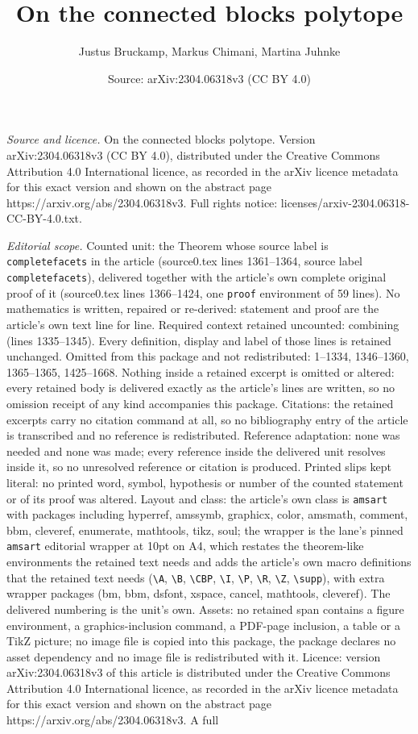 \documentclass[10pt,a4paper]{amsart}
\title[On the connected blocks polytope]{On the connected blocks polytope}
\author{Justus Bruckamp, Markus Chimani, Martina Juhnke}
\date{Source: arXiv:2304.06318v3 (CC BY 4.0)}
\begin{document}
\maketitle

\noindent\emph{Source and licence.} On the connected blocks polytope. Version arXiv:2304.06318v3 (CC BY 4.0), distributed under the Creative Commons Attribution 4.0 International licence, as recorded in the arXiv licence metadata for this exact version and shown on the abstract page https://arxiv.org/abs/2304.06318v3. Full rights notice: licenses/arxiv-2304.06318-CC-BY-4.0.txt.\par\smallskip

\noindent\textit{Editorial scope.} Counted unit: the Theorem whose source label is \texttt{completefacets} in the article (source0.tex lines 1361--1364, source label \texttt{completefacets}), delivered together with the article's own complete original proof of it (source0.tex lines 1366--1424, one \texttt{proof} environment of 59 lines). No mathematics is written, repaired or re-derived: statement and proof are the article's own text line for line. Required context retained uncounted: combining (lines 1335--1345). Every definition, display and label of those lines is retained unchanged. Omitted from this package and not redistributed: 1--1334, 1346--1360, 1365--1365, 1425--1668. Nothing inside a retained excerpt is omitted or altered: every retained body is delivered exactly as the article's lines are written, so no omission receipt of any kind accompanies this package. Citations: the retained excerpts carry no citation command at all, so no bibliography entry of the article is transcribed and no reference is redistributed. Reference adaptation: none was needed and none was made; every reference inside the delivered unit resolves inside it, so no unresolved reference or citation is produced. Printed slips kept literal: no printed word, symbol, hypothesis or number of the counted statement or of its proof was altered. Layout and class: the article's own class is \texttt{amsart} with packages including hyperref, amssymb, graphicx, color, amsmath, comment, bbm, cleveref, enumerate, mathtools, tikz, soul; the wrapper is the lane's pinned \texttt{amsart} editorial wrapper at 10pt on A4, which restates the theorem-like environments the retained text needs and adds the article's own macro definitions that the retained text needs (\texttt{\textbackslash A}, \texttt{\textbackslash B}, \texttt{\textbackslash CBP}, \texttt{\textbackslash I}, \texttt{\textbackslash P}, \texttt{\textbackslash R}, \texttt{\textbackslash Z}, \texttt{\textbackslash supp}), with extra wrapper packages (bm, bbm, dsfont, xspace, cancel, mathtools, cleveref). The delivered numbering is the unit's own. Assets: no retained span contains a figure environment, a graphics-inclusion command, a PDF-page inclusion, a table or a TikZ picture; no image file is copied into this package, the package declares no asset dependency and no image file is redistributed with it. Licence: version arXiv:2304.06318v3 of this article is distributed under the Creative Commons Attribution 4.0 International licence, as recorded in the arXiv licence metadata for this exact version and shown on the abstract page https://arxiv.org/abs/2304.06318v3. A full 
\end{document}

